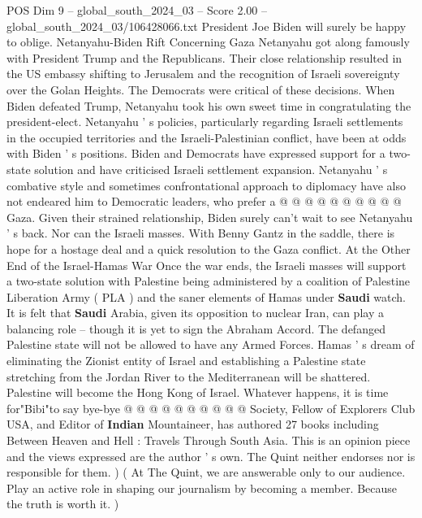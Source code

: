 \begin{textsample}{POS Dim 9 – global\_south\_2024\_03 – Score 2.00 – global\_south\_2024\_03/106428066.txt}
President Joe Biden will surely be happy to oblige.
Netanyahu-Biden Rift Concerning Gaza Netanyahu got along famously with President Trump and the Republicans.
Their close relationship resulted in the US embassy shifting to Jerusalem and the recognition of Israeli sovereignty over the Golan Heights.
The Democrats were critical of these decisions.
When Biden defeated Trump, Netanyahu took his own sweet time in congratulating the president-elect.
Netanyahu ' s policies, particularly regarding Israeli settlements in the occupied territories and the Israeli-Palestinian conflict, have been at odds with Biden ' s positions.
Biden and Democrats have expressed support for a two-state solution and have criticised Israeli settlement expansion.
Netanyahu ' s combative style and sometimes confrontational approach to diplomacy have also not endeared him to Democratic leaders, who prefer a @ @ @ @ @ @ @ @ @ @ Gaza.
Given their strained relationship, Biden surely can't wait to see Netanyahu ' s back.
Nor can the Israeli masses.
With Benny Gantz in the saddle, there is hope for a hostage deal and a quick resolution to the Gaza conflict.
At the Other End of the Israel-Hamas War Once the war ends, the Israeli masses will support a two-state solution with Palestine being administered by a coalition of Palestine Liberation Army ( PLA ) and the saner elements of Hamas under \textbf{Saudi} watch.
It is felt that \textbf{Saudi} Arabia, given its opposition to nuclear Iran, can play a balancing role -- though it is yet to sign the Abraham Accord.
The defanged Palestine state will not be allowed to have any Armed Forces.
Hamas ' s dream of eliminating the Zionist entity of Israel and establishing a Palestine state stretching from the Jordan River to the Mediterranean will be shattered.
Palestine will become the Hong Kong of Israel.
Whatever happens, it is time for"Bibi"to say bye-bye @ @ @ @ @ @ @ @ @ @ Society, Fellow of Explorers Club USA, and Editor of \textbf{Indian} Mountaineer, has authored 27 books including Between Heaven and Hell : Travels Through South Asia.
This is an opinion piece and the views expressed are the author ' s own.
The Quint neither endorses nor is responsible for them. ) ( At The Quint, we are answerable only to our audience.
Play an active role in shaping our journalism by becoming a member.
Because the truth is worth it. )

\end{textsample}
